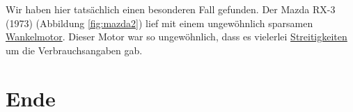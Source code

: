 \documentclass[
  ngerman,
]{book}
\begin{document}
Wir haben hier tatsächlich einen besonderen Fall gefunden. Der Mazda RX-3 (1973) (Abbildung \ref{fig:mazda2}) lief mit einem ungewöhnlich sparsamen \href{https://de.wikipedia.org/wiki/Wankelmotor}{Wankelmotor}. Dieser Motor war so ungewöhnlich, dass es vielerlei \href{https://nepis.epa.gov/Exe/ZyNET.exe/9100X47O.txt?ZyActionD=ZyDocument\&Client=EPA\&Index=Prior\%20to\%201976\&Docs=\&Query=\&Time=\&EndTime=\&SearchMethod=1\&TocRestrict=n\&Toc=\&TocEntry=\&QField=\&QFieldYear=\&QFieldMonth=\&QFieldDay=\&UseQField=\&IntQFieldOp=0\&ExtQFieldOp=0\&XmlQuery=\&File=D\%3A\%5CZYFILES\%5CINDEX\%20DATA\%5C70THRU75\%5CTXT\%5C00000016\%5C9100X47O.txt\&User=ANONYMOUS\&Password=anonymous\&SortMethod=h\%7C-\&MaximumDocuments=1\&FuzzyDegree=0\&ImageQuality=r75g8/r75g8/x150y150g16/i425\&Display=hpfr\&DefSeekPage=x\&SearchBack=ZyActionL\&Back=ZyActionS\&BackDesc=Results\%20page\&MaximumPages=1\&ZyEntry=2\#}{Streitigkeiten} um die Verbrauchsangaben gab.

\hypertarget{ende}{%
\section{Ende}\label{ende}}

  
\end{document}

